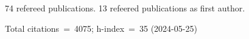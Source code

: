 74 refereed publications. 13 refeered publications as first author.

Total citations~=~4075; h-index~=~35 (2024-05-25)